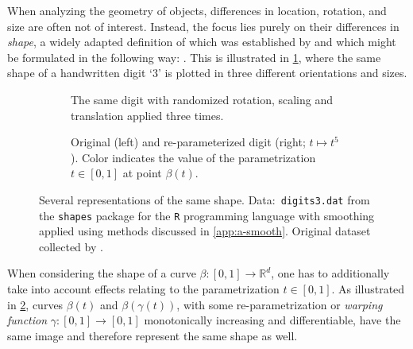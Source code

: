 When analyzing the geometry of objects, differences in location, rotation, and size are often not of interest.
Instead, the focus lies purely on their differences in  \textit{shape}, a widely adapted definition of which was established by \cite{Kendall1977} and which might be formulated in the following way: .
This is illustrated in \cref{fig:1-eucl}, where the same shape of a handwritten digit \enquote*{3} is plotted in three different orientations and sizes.
\begin{figure}
  \centering
  \begin{subfigure}{.48\textwidth}
    \centering
    \caption{The same digit with randomized rotation, scaling and translation applied three times.\\}
    \label{fig:1-eucl}
  \end{subfigure}\hfill%
  \begin{subfigure}{.48\textwidth}
    \centering
    \caption{Original (left) and re-parameterized digit (right; $t \mapsto t^5$). Color indicates the value of the parametrization $t \in [0,1]$ at point $\beta(t)$.}
    \label{fig:1-warp}
  \end{subfigure}
  \caption{Several representations of the same shape. Data:\ \texttt{digits3.dat} from the \texttt{shapes} package \parencite{shapes} for the \texttt{R} programming language \parencite{R} with smoothing applied using methods discussed in \cref{app:a-smooth}. Original dataset collected by \cite{Anderson1997}.}
  \label{fig:1-shape}
\end{figure}
When considering the shape of a curve $\beta : [0,1] \rightarrow \mathbb{R}^d$, one has to additionally take into account effects relating to the parametrization $t \in [0,1]$.
As illustrated in \cref{fig:1-warp}, curves $\beta(t)$ and $\beta(\gamma(t))$, with some re-parametrization or \textit{warping function} $\gamma : [0,1] \rightarrow [0,1]$ monotonically increasing and differentiable, have the same image and therefore represent the same shape as well.

